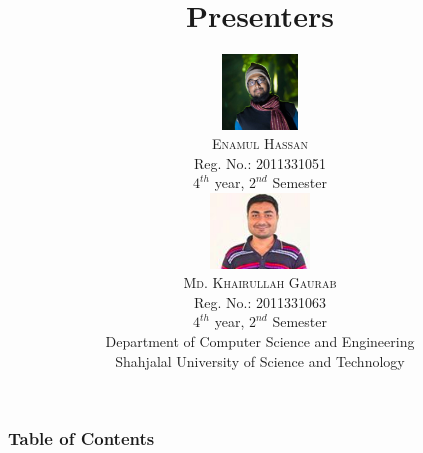 
	
	
	\begin{frame}
		\maketitle
	\end{frame}
	
	\title[NanoMapper]{Presenters}
	\author[Enam \& Gaurab (SUST)]{\begin{multicols}{2}
			\includegraphics[height=2cm]{./author1}\\\textsc{\large Enamul Hassan }\\
			Reg. No.: 2011331051\\ $4^{th}$ year, $2^{nd}$ Semester\\
			\includegraphics[height=2cm]{./author2}\\\textsc{\large Md. Khairullah Gaurab} \\
			Reg. No.: 2011331063\\ $4^{th}$ year, $2^{nd}$ Semester
		\end{multicols}
		Department of Computer Science and Engineering\\Shahjalal University of Science and Technology}
	
	\begin{frame}
		\maketitle
	\end{frame}
	
	\begin{frame}
		\frametitle{Table of Contents}
		\tableofcontents
	\end{frame}